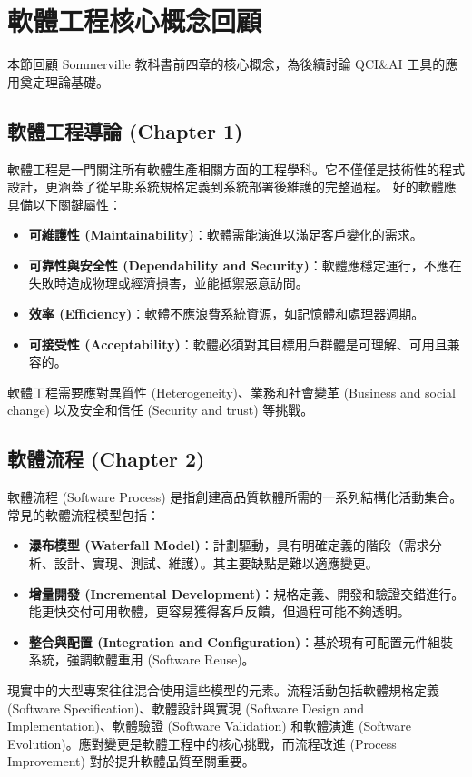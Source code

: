 \documentclass[twocolumn,11pt,a4paper]{article}
\begin{document}
\section{軟體工程核心概念回顧}
本節回顧 Sommerville \cite{sommerville2015} 教科書前四章的核心概念，為後續討論 QCI\&AI 工具的應用奠定理論基礎。

\subsection{軟體工程導論 (Chapter 1)}
軟體工程是一門關注所有軟體生產相關方面的工程學科。它不僅僅是技術性的程式設計，更涵蓋了從早期系統規格定義到系統部署後維護的完整過程。
好的軟體應具備以下關鍵屬性：
\begin{itemize}[noitemsep, topsep=0pt,leftmargin=*]
    \item \textbf{可維護性 (Maintainability)}：軟體需能演進以滿足客戶變化的需求。
    \item \textbf{可靠性與安全性 (Dependability and Security)}：軟體應穩定運行，不應在失敗時造成物理或經濟損害，並能抵禦惡意訪問。
    \item \textbf{效率 (Efficiency)}：軟體不應浪費系統資源，如記憶體和處理器週期。
    \item \textbf{可接受性 (Acceptability)}：軟體必須對其目標用戶群體是可理解、可用且兼容的。
\end{itemize}
軟體工程需要應對異質性 (Heterogeneity)、業務和社會變革 (Business and social change) 以及安全和信任 (Security and trust) 等挑戰。

\subsection{軟體流程 (Chapter 2)}
軟體流程 (Software Process) 是指創建高品質軟體所需的一系列結構化活動集合。常見的軟體流程模型包括：
\begin{itemize}[noitemsep, topsep=0pt]
    \item \textbf{瀑布模型 (Waterfall Model)}：計劃驅動，具有明確定義的階段（需求分析、設計、實現、測試、維護）。其主要缺點是難以適應變更。
    \item \textbf{增量開發 (Incremental Development)}：規格定義、開發和驗證交錯進行。能更快交付可用軟體，更容易獲得客戶反饋，但過程可能不夠透明。
    \item \textbf{整合與配置 (Integration and Configuration)}：基於現有可配置元件組裝系統，強調軟體重用 (Software Reuse)。
\end{itemize}
現實中的大型專案往往混合使用這些模型的元素。流程活動包括軟體規格定義 (Software Specification)、軟體設計與實現 (Software Design and Implementation)、軟體驗證 (Software Validation) 和軟體演進 (Software Evolution)。應對變更是軟體工程中的核心挑戰，而流程改進 (Process Improvement) 對於提升軟體品質至關重要。
\end{document}

